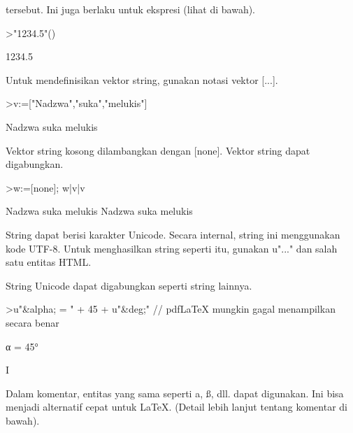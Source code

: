 \documentclass[a4paper,10pt]{article}
\begin{document}
\begin{eulernotebook}
\begin{eulercomment}
\begin{eulercomment}
\begin{eulercomment}
\begin{eulercomment}
\begin{eulercomment}
tersebut. Ini juga berlaku untuk ekspresi (lihat di bawah).
\end{eulercomment}
\begin{eulerprompt}
>"1234.5"()
\end{eulerprompt}
\begin{euleroutput}
  1234.5
\end{euleroutput}
\begin{eulercomment}
Untuk mendefinisikan vektor string, gunakan notasi vektor [...].
\end{eulercomment}
\begin{eulerprompt}
>v:=["Nadzwa","suka","melukis"]
\end{eulerprompt}
\begin{euleroutput}
  Nadzwa
  suka
  melukis
\end{euleroutput}
\begin{eulercomment}
Vektor string kosong dilambangkan dengan [none]. Vektor string dapat
digabungkan.
\end{eulercomment}
\begin{eulerprompt}
>w:=[none]; w|v|v
\end{eulerprompt}
\begin{euleroutput}
  Nadzwa
  suka
  melukis
  Nadzwa
  suka
  melukis
\end{euleroutput}
\begin{eulercomment}
String dapat berisi karakter Unicode. Secara internal, string ini
menggunakan kode UTF-8. Untuk menghasilkan string seperti itu, gunakan
u"..." dan salah satu entitas HTML. 

String Unicode dapat digabungkan seperti string lainnya.
\end{eulercomment}
\begin{eulerprompt}
>u"&alpha; = " + 45 + u"&deg;" // pdfLaTeX mungkin gagal menampilkan secara benar
\end{eulerprompt}
\begin{euleroutput}
  α = 45°
\end{euleroutput}
\begin{eulercomment}
I
\end{eulercomment}
\begin{eulercomment}
Dalam komentar, entitas yang sama seperti a, ß, dll. dapat digunakan.
Ini bisa menjadi alternatif cepat untuk LaTeX. (Detail lebih lanjut
tentang komentar di bawah).


\end{eulercomment}
\end{eulercomment}
\end{eulercomment}
\end{eulercomment}
\end{eulercomment}
\end{eulernotebook}
\end{document}

